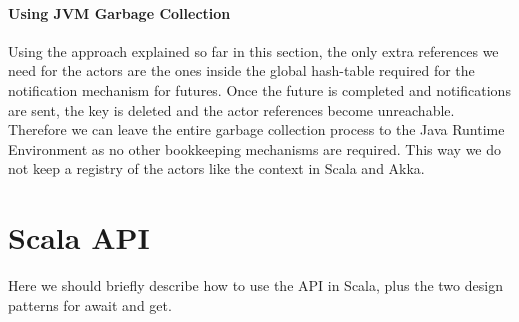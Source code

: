 \paragraph{Using JVM Garbage Collection}
Using the approach explained so far in this section, the only extra references we need for the actors are the ones inside the global hash-table required for the notification mechanism for futures. Once the future is completed and notifications are sent, the key is deleted and the actor references become unreachable. Therefore we can leave the entire garbage collection process to the Java Runtime Environment as no other bookkeeping mechanisms are required. This way we do not keep a registry of the actors like the {\ttfamily context} in Scala and Akka.

\section{Scala API}

Here we should briefly describe how to use the API in Scala, plus the two design patterns for await and get.


